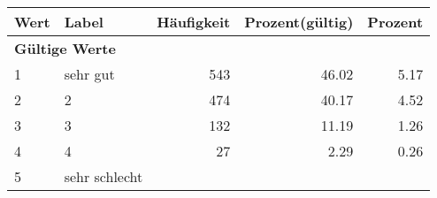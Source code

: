      \begin{longtable}{lXrrr}
     \toprule
     \textbf{Wert} & \textbf{Label} & \textbf{Häufigkeit} & \textbf{Prozent(gültig)} & \textbf{Prozent} \\
     \endhead
     \midrule
     \multicolumn{5}{l}{\textbf{Gültige Werte}}\\

     1 &
     \multicolumn{1}{X}{ sehr gut   } &


       \num{543} &
       \num[round-mode=places,round-precision=2]{46.02} &
         \num[round-mode=places,round-precision=2]{5.17} \\

     2 &
     \multicolumn{1}{X}{ 2   } &


       \num{474} &
       \num[round-mode=places,round-precision=2]{40.17} &
         \num[round-mode=places,round-precision=2]{4.52} \\

     3 &
     \multicolumn{1}{X}{ 3   } &


       \num{132} &
       \num[round-mode=places,round-precision=2]{11.19} &
         \num[round-mode=places,round-precision=2]{1.26} \\

     4 &
     \multicolumn{1}{X}{ 4   } &


       \num{27} &
       \num[round-mode=places,round-precision=2]{2.29} &
         \num[round-mode=places,round-precision=2]{0.26} \\

     5 &
     \multicolumn{1}{X}{ sehr schlecht   } &



\end{longtable}
